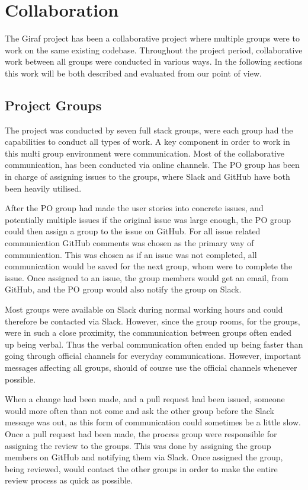 \chapter{Collaboration}
The Giraf project has been a collaborative project where multiple groups were to work on the same existing codebase.
Throughout the project period, collaborative work between all groups were conducted in various ways.  
In the following sections this work will be both described and evaluated from our point of view.

\section{Project Groups}
The project was conducted by seven full stack groups, were each group had the capabilities to conduct all types of work.
A key component in order to work in this multi group environment were communication.
Most of the collaborative communication, has been conducted via online channels.
The PO group has been in charge of assigning issues to the groups, where Slack and GitHub have both been heavily utilised.

After the PO group had made the user stories into concrete issues, and potentially multiple issues if the original issue was large enough, the PO group could then assign a group to the issue on GitHub.
For all issue related communication GitHub comments was chosen as the primary way of communication. 
This was chosen as if an issue was not completed, all communication would be saved for the next group, whom were to complete the issue.
Once assigned to an issue, the group members would get an email, from GitHub, and the PO group would also notify the group on Slack. 

Most groups were available on Slack during normal working hours and could therefore be contacted via Slack.
However, since the group rooms, for the groups, were in such a close proximity, the communication between groups often ended up being verbal.
Thus the verbal communication often ended up being faster than going through official channels for everyday communications.
However, important messages affecting all groups, should of course use the official channels whenever possible.

When a change had been made, and a pull request had been issued, someone would more often than not come and ask the other group before the Slack message was out, as this form of communication could sometimes be a little slow.
Once a pull request had been made, the process group were responsible for assigning the review to the groups. 
This was done by assigning the group members on GitHub and notifying them via Slack. 
Once assigned the group, being reviewed, would contact the other groups in order to make the entire review process as quick as possible.

